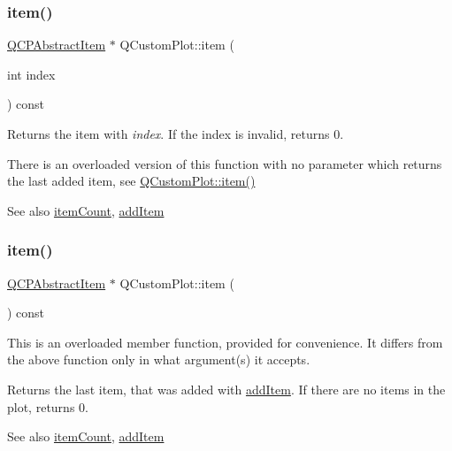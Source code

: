 \subsubsection{\texorpdfstring{item()}{item()}\hspace{0.1cm}{\footnotesize\ttfamily [1/2]}}
{\footnotesize\ttfamily \hyperlink{class_q_c_p_abstract_item}{Q\+C\+P\+Abstract\+Item} $\ast$ Q\+Custom\+Plot\+::item (\begin{DoxyParamCaption}\item[{int}]{index }\end{DoxyParamCaption}) const}

Returns the item with {\itshape index}. If the index is invalid, returns 0.

There is an overloaded version of this function with no parameter which returns the last added item, see \hyperlink{class_q_custom_plot_ac042f2e78edd228ccf2f26b7fe215239}{Q\+Custom\+Plot\+::item()}

\begin{DoxySeeAlso}{See also}
\hyperlink{class_q_custom_plot_a16025daf0341f9362be3080e404424c2}{item\+Count}, \hyperlink{class_q_custom_plot_aa500620379262321685cb7a7674cbd2a}{add\+Item} 
\end{DoxySeeAlso}
\hypertarget{class_q_custom_plot_a12eb2a283cf10a8a9176c01c0443e83e}{}\label{class_q_custom_plot_a12eb2a283cf10a8a9176c01c0443e83e} 
\subsubsection{\texorpdfstring{item()}{item()}\hspace{0.1cm}{\footnotesize\ttfamily [2/2]}}
{\footnotesize\ttfamily \hyperlink{class_q_c_p_abstract_item}{Q\+C\+P\+Abstract\+Item} $\ast$ Q\+Custom\+Plot\+::item (\begin{DoxyParamCaption}{ }\end{DoxyParamCaption}) const}

This is an overloaded member function, provided for convenience. It differs from the above function only in what argument(s) it accepts.

Returns the last item, that was added with \hyperlink{class_q_custom_plot_aa500620379262321685cb7a7674cbd2a}{add\+Item}. If there are no items in the plot, returns 0.

\begin{DoxySeeAlso}{See also}
\hyperlink{class_q_custom_plot_a16025daf0341f9362be3080e404424c2}{item\+Count}, \hyperlink{class_q_custom_plot_aa500620379262321685cb7a7674cbd2a}{add\+Item} 
\end{DoxySeeAlso}
\hypertarget{class_q_custom_plot_ac08578e0e6c059c83a8d340ba0038e8e}{}\label{class_q_custom_plot_ac08578e0e6c059c83a8d340ba0038e8e} 
